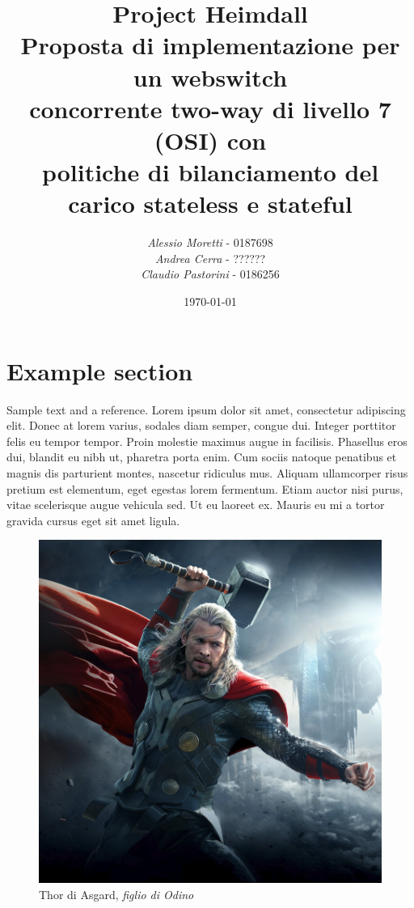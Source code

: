 \documentclass[italian]{tktltiki2}
\title{%
  \huge Project Heimdall \\
  \large Proposta di implementazione per un webswitch \\ 
    concorrente two-way di livello 7 (OSI) con \\
    politiche di bilanciamento del carico stateless e stateful
  }
\author{\emph{Alessio Moretti} - 0187698 \\\emph{Andrea Cerra} - ??????\\\emph{Claudio Pastorini} - 0186256}
\date{\today}
\begin{document}
\maketitle        %

\tableofcontents  %

\mainmatter       %

\section{Example section}
Sample text and a reference\cite{lamport94}. Lorem ipsum dolor sit amet, consectetur adipiscing elit. Donec at lorem varius, sodales diam semper, congue dui. Integer porttitor felis eu tempor tempor. Proin molestie maximus augue in facilisis. Phasellus eros dui, blandit eu nibh ut, pharetra porta enim. Cum sociis natoque penatibus et magnis dis parturient montes, nascetur ridiculus mus. Aliquam ullamcorper risus pretium est elementum, eget egestas lorem fermentum. Etiam auctor nisi purus, vitae scelerisque augue vehicula sed. Ut eu laoreet ex. Mauris eu mi a tortor gravida cursus eget sit amet ligula.

\begin{figure}
\centering
\includegraphics[width=\textwidth]{images/thor}
\caption{Thor di Asgard, \emph{figlio di Odino}}
\end{figure}
\end{document}
